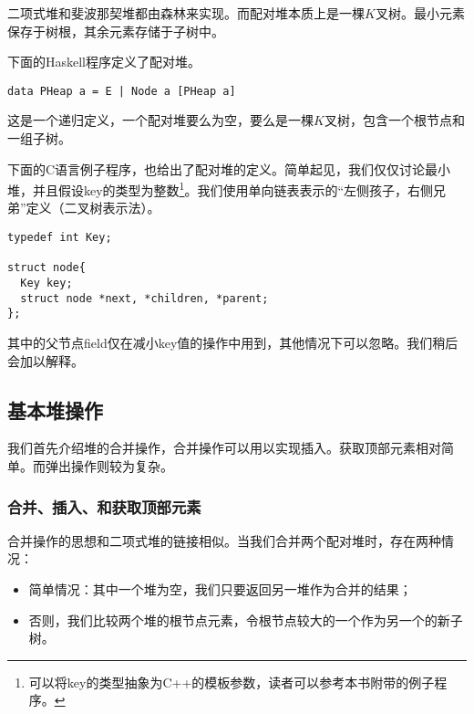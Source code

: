 \documentclass[UTF8]{article}
\begin{document}
二项式堆和斐波那契堆都由森林来实现。而配对堆本质上是一棵$K$叉树。最小元素保存于树根，其余元素存储于子树中。

下面的Haskell程序定义了配对堆。

\lstset{language=Haskell}
\begin{lstlisting}
data PHeap a = E | Node a [PHeap a]
\end{lstlisting}

这是一个递归定义，一个配对堆要么为空，要么是一棵$K$叉树，包含一个根节点和一组子树。

下面的C语言例子程序，也给出了配对堆的定义。简单起见，我们仅仅讨论最小堆，并且假设key的类型为整数\footnote{可以将key的类型抽象为C++的模板参数，读者可以参考本书附带的例子程序。}。我们使用单向链表表示的“左侧孩子，右侧兄弟”定义（二叉树表示法\cite{CLRS}）。

\lstset{language=C}
\begin{lstlisting}
typedef int Key;

struct node{
  Key key;
  struct node *next, *children, *parent;
};
\end{lstlisting}

其中的父节点field仅在减小key值的操作中用到，其他情况下可以忽略。我们稍后会加以解释。


\subsection{基本堆操作}

我们首先介绍堆的合并操作，合并操作可以用以实现插入。获取顶部元素相对简单。而弹出操作则较为复杂。

\subsubsection{合并、插入、和获取顶部元素}
 

合并操作的思想和二项式堆的链接相似。当我们合并两个配对堆时，存在两种情况：

\begin{itemize}
\item 简单情况：其中一个堆为空，我们只要返回另一堆作为合并的结果；

\item 否则，我们比较两个堆的根节点元素，令根节点较大的一个作为另一个的新子树。
\end{itemize}
\end{document}
